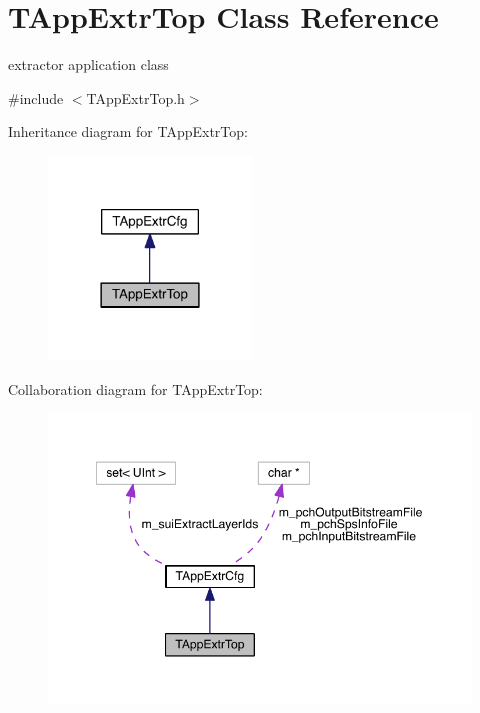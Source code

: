 \hypertarget{class_t_app_extr_top}{}\section{T\+App\+Extr\+Top Class Reference}
\label{class_t_app_extr_top}


extractor application class  




{\ttfamily \#include $<$T\+App\+Extr\+Top.\+h$>$}



Inheritance diagram for T\+App\+Extr\+Top\+:
\nopagebreak
\begin{figure}[H]
\begin{center}
\leavevmode
\includegraphics[width=153pt]{db/d6f/class_t_app_extr_top__inherit__graph}
\end{center}
\end{figure}


Collaboration diagram for T\+App\+Extr\+Top\+:
\nopagebreak
\begin{figure}[H]
\begin{center}
\leavevmode
\includegraphics[width=349pt]{db/d75/class_t_app_extr_top__coll__graph}
\end{center}
\end{figure}
